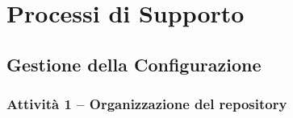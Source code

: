 \documentclass[a4paper, 11pt, oneside]{scrartcl}
\begin{document}
\newpage
\section{Processi di Supporto}

\subsection{Gestione della Configurazione}

\subsubsection{Attività 1 – Organizzazione del repository}
\end{document}
